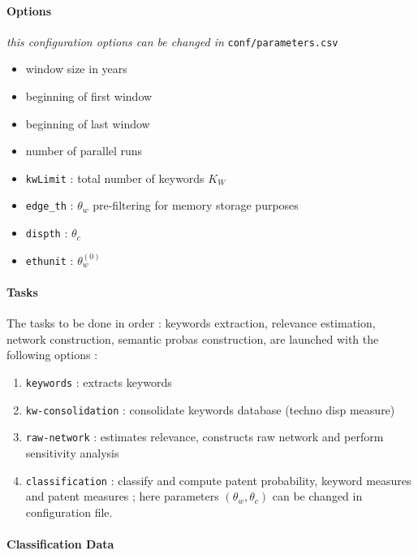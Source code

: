 \documentclass[12pt,twoside,a4paper]{article}
\begin{document}
\paragraph{Options}

\textit{this configuration options can be changed in }\texttt{conf/parameters.csv}

\begin{itemize}
\item window size in years
\item beginning of first window
\item beginning of last window
\item number of parallel runs
\item \texttt{kwLimit} : total number of keywords $K_W$
\item \texttt{edge{\_}th} : $\theta_w$ pre-filtering for memory storage purposes
\item \texttt{dispth} : $\theta_c$
\item \texttt{ethunit} : $\theta_w^{(0)}$
\end{itemize}

\paragraph{Tasks}

The tasks to be done in order : keywords extraction, relevance estimation, network construction, semantic probas construction, are launched with the following options :

\begin{enumerate}
\item \texttt{keywords} : extracts keywords
\item \texttt{kw-consolidation} : consolidate keywords database (techno disp measure)
\item \texttt{raw-network} : estimates relevance, constructs raw network and perform sensitivity analysis
\item \texttt{classification} : classify and compute patent probability, keyword measures and patent measures ; here parameters $(\theta_w,\theta_c)$ can be changed in configuration file.
\end{enumerate}



\paragraph{Classification Data}
\end{document}

